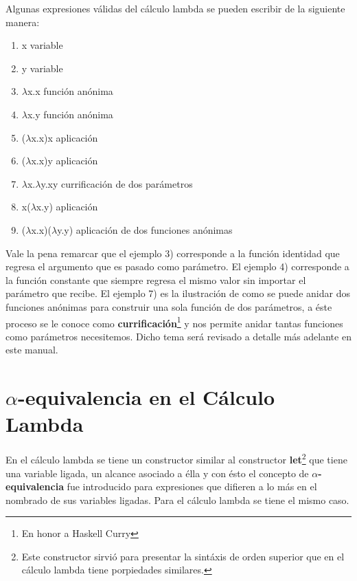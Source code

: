     \begin{exercise}
        Algunas expresiones válidas del cálculo lambda se pueden escribir de la siguiente manera:
        \begin{enumerate}
            \item x \; \; \; \; \; \; \; \; variable
            \item y \; \; \; \; \; \; \; \; variable
            \item $\lambda$x.x \; \; \; \; \; \; función anónima
            \item $\lambda$x.y \; \; \; \; \; \;  función anónima
            \item ($\lambda$x.x)x \; \; \; \;  aplicación
            \item ($\lambda$x.x)y \; \; \; \;  aplicación
            \item $\lambda$x.$\lambda$y.xy \; \; \;  currificación de dos parámetros
            \item x($\lambda$x.y) \; \; \; \;  aplicación
            \item ($\lambda$x.x)($\lambda$y.y) \; aplicación de dos funciones anónimas
        \end{enumerate}
    \end{exercise}

    Vale la pena remarcar que el ejemplo 3) corresponde a la función identidad que regresa el argumento que es pasado como parámetro. El ejemplo 4) corresponde a la función constante que siempre regresa el mismo valor sin importar el parámetro que recibe. El ejemplo 7) es la ilustración de como se puede anidar dos funciones anónimas para construir una sola función de dos parámetros, a éste proceso se le conoce como \textbf{currificación}\footnote{En honor a Haskell Curry} y nos permite anidar tantas funciones como parámetros necesitemos. Dicho tema será revisado a detalle más adelante en este manual. \\

\section{$\alpha$-equivalencia en el Cálculo Lambda}

    En el cálculo lambda se tiene un constructor similar al constructor \textbf{let}\footnote{Este constructor sirvió para presentar la sintáxis de orden superior que en el cálculo lambda tiene porpiedades similares.} que tiene una variable ligada, un alcance asociado a élla y con ésto el concepto de \textbf{$\alpha$-equivalencia} fue introducido para expresiones que difieren a lo más en el nombrado de sus variables ligadas. Para el cálculo lambda se tiene el mismo caso.

